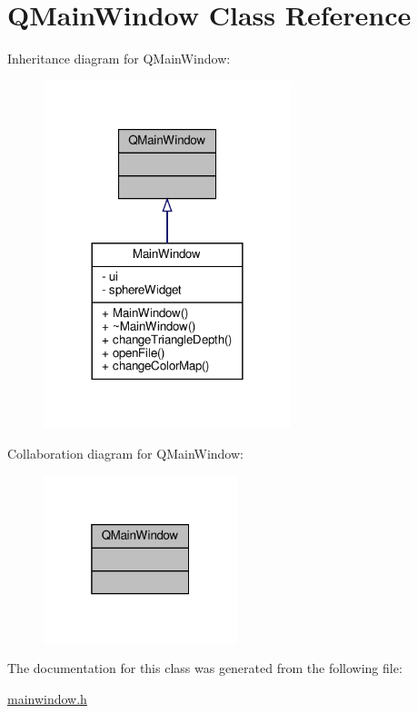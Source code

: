 \hypertarget{class_q_main_window}{}\section{Q\+Main\+Window Class Reference}
\label{class_q_main_window}


Inheritance diagram for Q\+Main\+Window\+:
\nopagebreak
\begin{figure}[H]
\begin{center}
\leavevmode
\includegraphics[width=204pt]{d9/d66/class_q_main_window__inherit__graph}
\end{center}
\end{figure}


Collaboration diagram for Q\+Main\+Window\+:
\nopagebreak
\begin{figure}[H]
\begin{center}
\leavevmode
\includegraphics[width=160pt]{d6/d3f/class_q_main_window__coll__graph}
\end{center}
\end{figure}


The documentation for this class was generated from the following file\+:\begin{DoxyCompactItemize}
\item 
\hyperlink{mainwindow_8h}{mainwindow.\+h}\end{DoxyCompactItemize}
